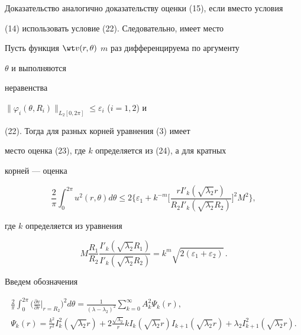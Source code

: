  


Доказательство аналогично доказательству оценки (15), если вместо условия 


(14) использовать условие (22). Следовательно, имеет место 


 


\begin{cor} 


Пусть функция $\wt v(r,\theta)$\; $m$ раз дифференцируема по аргументу 


$\theta$ и выполняются 


неравенства 


$\|\varphi_i(\theta,R_i)\|_{L_2[0,2\pi]}\le\varepsilon_i$ ($i=1,2$) и 


(22). Тогда для разных корней уравнения (3) имеет 


место оценка (23), где $k$ определяется из (24), а для кратных 


корней --- оценка 


$$ 


\frac{2}{\pi}\int^{2\pi}_0u^2(r,\theta)d\theta\le2\bigg\{ 


\varepsilon_1+k^{-m}\bigg[ 


\frac{r I'_k(\sqrt{\lambda_2}r)}{R_2I'_k(\sqrt{\lambda_2}R_2)} 


\bigg]^2M^2\bigg\}, 


$$ 


где $k$ определяется из уравнения 


$$ 


M\frac{R_1}{R_2} 


\frac{I'_k(\sqrt{\lambda_2}R_1)}{I'_k(\sqrt{\lambda_2}R_2)} 


=k^m\sqrt{2(\varepsilon_1+\varepsilon_2)}\,. 


$$ 


\end{cor} 


 


Введем обозначения 


\begin{gather*} 


\frac{2}{\pi}\int^{2\pi}_0\biggl(\frac{\partial v}{\partial r} 


\bigg|_{r=R_2}\biggr)^2d\theta= 


\frac{1}{(\lambda-\lambda_2)^2}\sum^\infty_{k=0} 


A^2_k\Psi_k(r),\\ 


%


\Psi_k(r)=\frac{k^2}{r^2}I^2_k(\sqrt{\lambda_2}r)+2 


\frac{\sqrt{\lambda_2}}{r}k I_k(\sqrt{\lambda_2}r) 


I_{k+1}(\sqrt{\lambda_2}r)+\lambda_2I^2_{k+1} 


(\sqrt{\lambda_2}r). 


\end{gather*} 


